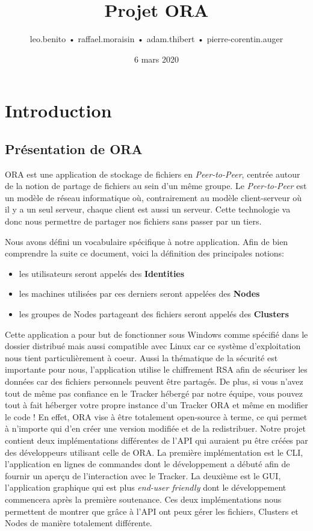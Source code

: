 \documentclass[11pt, a4paper]{report}
\title{Projet ORA}
\author{leo.benito  •  raffael.moraisin  •  adam.thibert  •  pierre-corentin.auger}
\date{6 mars 2020}
\begin{document}
  \maketitle
  \thispagestyle{empty}   %
  \clearpage
 
  \tableofcontents
  \thispagestyle{empty}
  \clearpage

  \section{Introduction}
    \subsection{Présentation de ORA}
    ORA est une application de stockage de fichiers en \textit{Peer-to-Peer}, centrée autour de la notion de partage de fichiers au sein d'un même groupe. Le \textit{Peer-to-Peer} est un modèle de réseau informatique où, contrairement au modèle client-serveur où il y a un seul serveur, chaque client est aussi un serveur. Cette technologie va donc nous permettre de partager nos fichiers sans passer par un tiers.\newline

    Nous avons défini un vocabulaire spécifique à notre application. Afin de bien comprendre la suite ce document, voici la définition des principales notions:
    \begin{itemize}
        \item les utilisateurs seront appelés des \textbf{Identities}
        \item les machines utilisées par ces derniers seront appelées des \textbf{Nodes}
        \item les groupes de Nodes partageant des fichiers seront appelés des \textbf{Clusters}
    \end{itemize}
    \bigbreak
    
    Cette application a pour but de fonctionner sous Windows comme spécifié dans le dossier distribué mais aussi compatible avec Linux car ce système d'exploitation nous tient particulièrement à coeur.
    Aussi la thématique de la sécurité est importante pour nous, l'application utilise le chiffrement RSA afin de sécuriser les données car des fichiers personnels peuvent être partagés. De plus, si vous n'avez tout de même pas confiance en le Tracker hébergé par notre équipe, vous pouvez tout à fait héberger votre propre instance d'un Tracker ORA et même en modifier le code !
    En effet, ORA vise à être totalement open-source à terme, ce qui permet à n'importe qui d'en créer une version modifiée et de la redistribuer. Notre projet contient deux implémentations différentes de l'API qui auraient pu être créées par des développeurs utilisant celle de ORA. La première implémentation est le CLI, l'application en lignes de commandes dont le développement a débuté afin de fournir un aperçu de l'interaction avec le Tracker. La deuxième est le GUI, l'application graphique qui est plus \textit{end-user friendly} dont le développement commencera après la première soutenance. Ces deux implémentations nous permettent de montrer que grâce à l'API ont peux gérer les fichiers, Clusters et Nodes de manière totalement différente.
\end{document}
